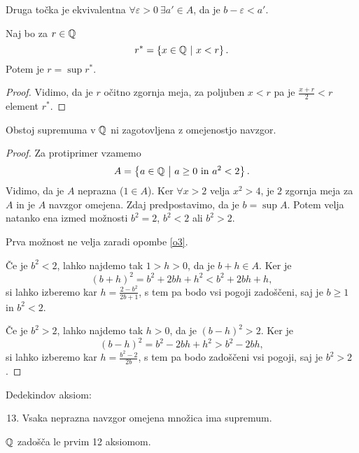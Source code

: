 \documentclass[12pt, a4paper]{article}
\begin{document}
\begin{opomba}
Druga točka je ekvivalentna $\forall\varepsilon>0~\exists a'\in A$, da je $b-\varepsilon < a'$.
\end{opomba}

\begin{opomba}
Naj bo za $r\in\mathbb{Q}$
\[
r^*=\left\{x\in\mathbb{Q}~\middle\vert~x<r\right\}.
\]
Potem je $r=\sup r^*$.
\end{opomba}

\begin{proof}
Vidimo, da je $r$ očitno zgornja meja, za poljuben $x<r$ pa je $\frac{x+r}{2}<r$ element $r^*$.
\end{proof}

\begin{opomba}
Obstoj supremuma v $\mathbb{Q}$ ni zagotovljena z omejenostjo navzgor.
\end{opomba}

\begin{proof}
Za protiprimer vzamemo
\[
A=\left\{a\in\mathbb{Q}~\middle\vert~\text{$a\geq 0$ in $a^2<2$}\right\}.
\]
Vidimo, da je $A$ neprazna ($1\in A$). Ker $\forall x>2$ velja  $x^2>4$, je $2$ zgornja meja za $A$ in je $A$ navzgor omejena. Zdaj predpostavimo, da je $b=\sup A$. Potem velja natanko ena izmed možnosti $b^2=2$, $b^2<2$ ali $b^2>2$.

Prva možnost ne velja zaradi opombe \ref{o3}.

Če je $b^2<2$, lahko najdemo tak $1>h>0$, da je $b+h\in A$. Ker je
\[(b+h)^2=b^2+2bh+h^2<b^2+2bh+h,\]
si lahko izberemo kar $h=\frac{2-b^2}{2b+1}$, s tem pa bodo vsi pogoji zadoščeni, saj je $b\geq 1$ in $b^2<2$.

Če je $b^2>2$, lahko najdemo tak $h>0$, da je $(b-h)^2>2$. Ker je
\[(b-h)^2=b^2-2bh+h^2>b^2-2bh,\]
si lahko izberemo kar $h=\frac{b^2-2}{2b}$, s tem pa bodo zadoščeni vsi pogoji, saj je $b^2>2$.
\end{proof}

\begin{okvir}
\begin{definicija}
Dedekindov aksiom:

\begin{enumerate}[label=A\arabic*.]
\setcounter{enumi}{12}
\item Vsaka neprazna navzgor omejena množica ima supremum.
\end{enumerate}
\end{definicija}
\end{okvir}

\begin{opomba}
$\mathbb{Q}$ zadošča le prvim 12 aksiomom.
\end{opomba}
\end{document}
